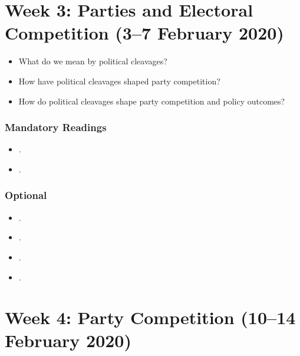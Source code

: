 \documentclass[abstract=on,parskip=full,headings=standardclasses,fontsize=11pt,paper=a4]{scrartcl}
\begin{document}
\section{Week 3: Parties and Electoral Competition (3--7 February 2020)}

\begin{itemize}
\renewcommand\labelitemi{--}
\item  What do we mean by political cleavages?
\item How have political cleavages shaped party competition? 
\item How do political cleavages shape party competition and policy outcomes?
\end{itemize}


\subsubsection*{Mandatory Readings}

\begin{itemize}
\item {}.
\item {}.
\end{itemize}



\subsubsection*{Optional}
\begin{itemize}
\item {}.
\item {}.
\item {}.
\item {}.
\end{itemize}







\section{Week 4:  Party Competition (10--14 February 2020)}
\end{document}
